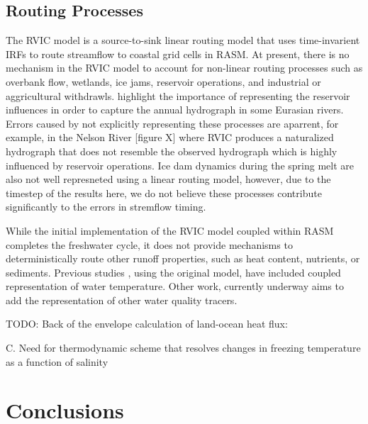 \documentclass[jgrga, draft]{agutex}
\begin{document}
\begin{article}
\subsection{Routing Processes}
The RVIC model is a source-to-sink linear routing model that uses time-invarient IRFs to route streamflow to coastal grid cells in RASM.
At present, there is no mechanism in the RVIC model to account for non-linear routing processes such as overbank flow, wetlands, ice jams, reservoir operations, and industrial or aggricultural withdrawls.
\citet{Adam_2007} highlight the importance of representing the reservoir influences in order to capture the annual hydrograph in some Eurasian rivers.
Errors caused by not explicitly representing these processes are aparrent, for example, in the Nelson River [figure X] where RVIC produces a naturalized hydrograph that does not resemble the observed hydrograph which is highly influenced by reservoir operations.
Ice dam dynamics during the spring melt are also not well represneted using a linear routing model, however, due to the timestep of the results here, we do not believe these processes contribute significantly to the errors in stremflow timing.

While the initial implementation of the RVIC model coupled within RASM completes the freshwater cycle, it does not provide mechanisms to deterministically route other runoff properties, such as heat content, nutrients, or sediments.
Previous studies \citep[e.g.][]{vanVliet_2011,vanVliet_2012}, using the original \citet{Lohmann_1996} model, have included coupled representation of water temperature.
Other work, currently underway aims to add the representation of other water quality tracers.

TODO: Back of the envelope calculation of land-ocean heat flux: \citep{Lammers_2007}

C.	Need for thermodynamic scheme that resolves changes in freezing temperature as a function of salinity

\section{Conclusions}




\end{article}
\end{document}

